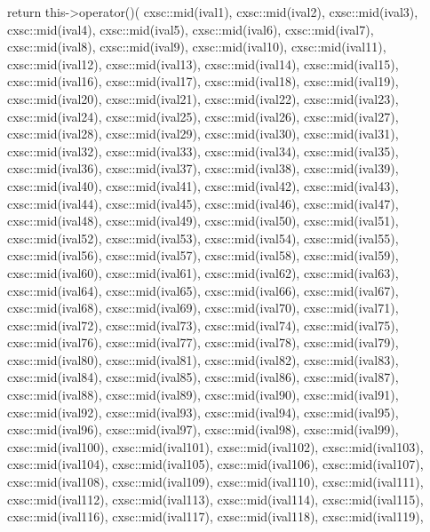 \begin{DoxyCode}
{
  return this->operator()(
      cxsc::mid(ival1),
  cxsc::mid(ival2),
  cxsc::mid(ival3),
  cxsc::mid(ival4),
  cxsc::mid(ival5),
  cxsc::mid(ival6),
  cxsc::mid(ival7),
  cxsc::mid(ival8),
  cxsc::mid(ival9),
  cxsc::mid(ival10),
  cxsc::mid(ival11),
  cxsc::mid(ival12),
  cxsc::mid(ival13),
  cxsc::mid(ival14),
  cxsc::mid(ival15),
  cxsc::mid(ival16),
  cxsc::mid(ival17),
  cxsc::mid(ival18),
  cxsc::mid(ival19),
  cxsc::mid(ival20),
  cxsc::mid(ival21),
  cxsc::mid(ival22),
  cxsc::mid(ival23),
  cxsc::mid(ival24),
  cxsc::mid(ival25),
  cxsc::mid(ival26),
  cxsc::mid(ival27),
  cxsc::mid(ival28),
  cxsc::mid(ival29),
  cxsc::mid(ival30),
  cxsc::mid(ival31),
  cxsc::mid(ival32),
  cxsc::mid(ival33),
  cxsc::mid(ival34),
  cxsc::mid(ival35),
  cxsc::mid(ival36),
  cxsc::mid(ival37),
  cxsc::mid(ival38),
  cxsc::mid(ival39),
  cxsc::mid(ival40),
  cxsc::mid(ival41),
  cxsc::mid(ival42),
  cxsc::mid(ival43),
  cxsc::mid(ival44),
  cxsc::mid(ival45),
  cxsc::mid(ival46),
  cxsc::mid(ival47),
  cxsc::mid(ival48),
  cxsc::mid(ival49),
  cxsc::mid(ival50),
  cxsc::mid(ival51),
  cxsc::mid(ival52),
  cxsc::mid(ival53),
  cxsc::mid(ival54),
  cxsc::mid(ival55),
  cxsc::mid(ival56),
  cxsc::mid(ival57),
  cxsc::mid(ival58),
  cxsc::mid(ival59),
  cxsc::mid(ival60),
  cxsc::mid(ival61),
  cxsc::mid(ival62),
  cxsc::mid(ival63),
  cxsc::mid(ival64),
  cxsc::mid(ival65),
  cxsc::mid(ival66),
  cxsc::mid(ival67),
  cxsc::mid(ival68),
  cxsc::mid(ival69),
  cxsc::mid(ival70),
  cxsc::mid(ival71),
  cxsc::mid(ival72),
  cxsc::mid(ival73),
  cxsc::mid(ival74),
  cxsc::mid(ival75),
  cxsc::mid(ival76),
  cxsc::mid(ival77),
  cxsc::mid(ival78),
  cxsc::mid(ival79),
  cxsc::mid(ival80),
  cxsc::mid(ival81),
  cxsc::mid(ival82),
  cxsc::mid(ival83),
  cxsc::mid(ival84),
  cxsc::mid(ival85),
  cxsc::mid(ival86),
  cxsc::mid(ival87),
  cxsc::mid(ival88),
  cxsc::mid(ival89),
  cxsc::mid(ival90),
  cxsc::mid(ival91),
  cxsc::mid(ival92),
  cxsc::mid(ival93),
  cxsc::mid(ival94),
  cxsc::mid(ival95),
  cxsc::mid(ival96),
  cxsc::mid(ival97),
  cxsc::mid(ival98),
  cxsc::mid(ival99),
  cxsc::mid(ival100),
  cxsc::mid(ival101),
  cxsc::mid(ival102),
  cxsc::mid(ival103),
  cxsc::mid(ival104),
  cxsc::mid(ival105),
  cxsc::mid(ival106),
  cxsc::mid(ival107),
  cxsc::mid(ival108),
  cxsc::mid(ival109),
  cxsc::mid(ival110),
  cxsc::mid(ival111),
  cxsc::mid(ival112),
  cxsc::mid(ival113),
  cxsc::mid(ival114),
  cxsc::mid(ival115),
  cxsc::mid(ival116),
  cxsc::mid(ival117),
  cxsc::mid(ival118),
  cxsc::mid(ival119),
}
\end{DoxyCode}
